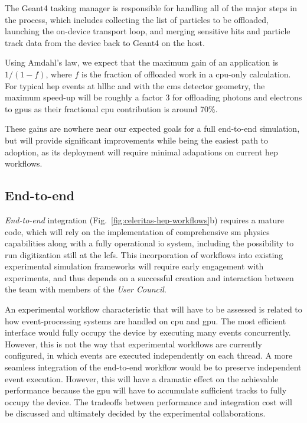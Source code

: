 The Geant4 tasking manager is responsible for handling all of the major steps in
the process, which includes collecting the list of particles to be offloaded,
launching the \celeritas on-device transport loop, and merging sensitive hits
and particle track data from the device back to Geant4 on the host.

Using Amdahl's law, we expect that the maximum gain of an \acceleritas
application is $1/(1-f)$, where $f$ is the fraction of offloaded work in a
\ac{cpu}-only calculation.  For typical \ac{hep} events at \acs{hllhc} and with
the \ac{cms} detector geometry, the maximum speed-up will be roughly a factor 3
for offloading photons and electrons to \acp{gpu} as their fractional \ac{cpu}
contribution is around 70\%.

These gains are nowhere near our expected goals for a full end-to-end \celeritas
simulation, but \acceleritas will provide significant improvements while being
the easiest path to adoption, as its deployment will require minimal adapations
on current \ac{hep} workflows.

\subsection{End-to-end \celeritas}
\label{sec:end-to-end}

\emph{End-to-end} \celeritas integration
(Fig.~\ref{fig:celeritas-hep-workflows}b) requires a mature \celeritas code,
which will rely on the implementation of comprehensive \ac{sm} physics
capabilities along with a fully operational \ac{io} system, including the
possibility to run digitization still at the \acp{lcf}. This incorporation of
\celeritas workflows into existing experimental simulation frameworks will
require early engagement with experiments, and thus depends on a successful
creation and interaction between the \celeritas team with members of the
\emph{User Council}.

An experimental workflow characteristic that will have to be assessed is related
to how event-processing systems are handled on \ac{cpu} and \ac{gpu}. The most
efficient interface would fully occupy the device by executing many events
concurrently.  However, this is not the way that experimental workflows are
currently configured, in which events are executed independently on each thread.
A more seamless integration of the end-to-end workflow would be to preserve
independent event execution.  However, this will have a dramatic effect on the
achievable performance because the \ac{gpu} will have to accumulate sufficient
tracks to fully occupy the device. The tradeoffs between performance and
integration cost will be discussed and ultimately decided by the experimental
collaborations.

